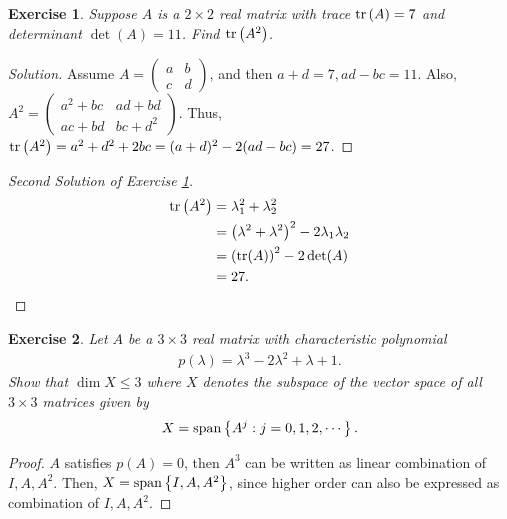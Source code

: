 \documentclass[10pt]{book}
\newtheorem{exercise}{Exercise}[section]
\theoremstyle{definition}
\numberwithin{equation}{chapter}
\begin{document}
\begin{exercise}\label{exer_trace}
Suppose $A$ is a $2 \times 2$ real matrix with trace ${\rm tr}\left(A \right) = 7$ and determinant $\det (A) = 11$. Find ${\rm tr}\left(A^2 \right)$.
\end{exercise}
\begin{proof}[Solution]
Assume $A = \begin{pmatrix} a & b \\ c & d \end{pmatrix}$, and then $a + d = 7, ad - bc = 11$. Also, $A^2 = \begin{pmatrix} a^2+bc &ad+bd \\ ac+bd & bc+d^2 \end{pmatrix}$. Thus, ${\rm tr}\left(A^2 \right) = a^2 + d^2 + 2bc = (a+d)^2 - 2(ad-bc) = 27$.
\end{proof}

\medskip

\begin{proof}[Second Solution of Exercise \ref{exer_trace}]
\begin{align*}
    {\rm tr}\left(A^2 \right) & = \lambda_1^2 + \lambda_2^2 \\
    & = \left(\lambda^2 + \lambda^2\right)^2 - 2 \lambda_1 \lambda_2 \\
    & = \left( {\rm tr}(A)\right)^2 - 2 \det (A) \\
    & = 27.
\end{align*}
\end{proof}

\medskip

\begin{exercise}
Let $A$ be a $3 \times 3$ real matrix with characteristic polynomial
\begin{align*}
    p(\lambda) = \lambda^3 - 2 \lambda^2 + \lambda + 1.
\end{align*}
Show that $\dim X \leq 3$ where $X$ denotes the subspace of the vector space of all $3 \times 3$ matrices given by 
\begin{align*}
    X = {\rm span} \left\{A^j: j = 0,1,2,\cdots\right\}.
\end{align*}
\end{exercise}
\begin{proof}
$A$ satisfies $p(A) = 0$, then $A^3$ can be written as linear combination of $I, A, A^2$. Then, $X = {\rm span} \left\{I, A, A^2\right\}$, since higher order can also be expressed as combination of $I, A, A^2$.
\end{proof}
\end{document}
